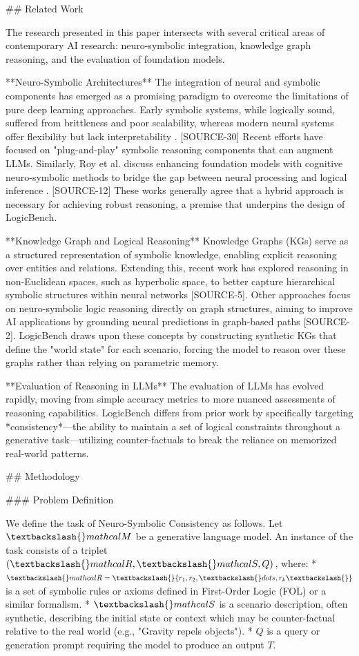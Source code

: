 \documentclass{article}
\begin{document}
\#\# Related Work

The research presented in this paper intersects with several critical areas of contemporary AI research: neuro-symbolic integration, knowledge graph reasoning, and the evaluation of foundation models.

**Neuro-Symbolic Architectures**
The integration of neural and symbolic components has emerged as a promising paradigm to overcome the limitations of pure deep learning approaches. Early symbolic systems, while logically sound, suffered from brittleness and poor scalability, whereas modern neural systems offer flexibility but lack interpretability . [SOURCE-30] Recent efforts have focused on "plug-and-play" symbolic reasoning components that can augment LLMs.  Similarly, Roy et al. discuss enhancing foundation models with cognitive neuro-symbolic methods to bridge the gap between neural processing and logical inference . [SOURCE-12] These works generally agree that a hybrid approach is necessary for achieving robust reasoning, a premise that underpins the design of LogicBench.

**Knowledge Graph and Logical Reasoning**
Knowledge Graphs (KGs) serve as a structured representation of symbolic knowledge, enabling explicit reasoning over entities and relations.  Extending this, recent work has explored reasoning in non-Euclidean spaces, such as hyperbolic space, to better capture hierarchical symbolic structures within neural networks [SOURCE-5]. Other approaches focus on neuro-symbolic logic reasoning directly on graph structures, aiming to improve AI applications by grounding neural predictions in graph-based paths [SOURCE-2]. LogicBench draws upon these concepts by constructing synthetic KGs that define the "world state" for each scenario, forcing the model to reason over these graphs rather than relying on parametric memory.

**Evaluation of Reasoning in LLMs**
The evaluation of LLMs has evolved rapidly, moving from simple accuracy metrics to more nuanced assessments of reasoning capabilities.  LogicBench differs from prior work by specifically targeting *consistency*—the ability to maintain a set of logical constraints throughout a generative task—utilizing counter-factuals to break the reliance on memorized real-world patterns.

\#\# Methodology

\#\#\# Problem Definition

We define the task of Neuro-Symbolic Consistency as follows. Let $\textbackslash{}mathcal{M}$ be a generative language model. An instance of the task consists of a triplet $(\textbackslash{}mathcal{R}, \textbackslash{}mathcal{S}, Q)$, where:
* $\textbackslash{}mathcal{R} = \textbackslash{}{r_1, r_2, \textbackslash{}dots, r_k\textbackslash{}}$ is a set of symbolic rules or axioms defined in First-Order Logic (FOL) or a similar formalism.
* $\textbackslash{}mathcal{S}$ is a scenario description, often synthetic, describing the initial state or context which may be counter-factual relative to the real world (e.g., "Gravity repels objects").
* $Q$ is a query or generation prompt requiring the model to produce an output $T$.
\end{document}
